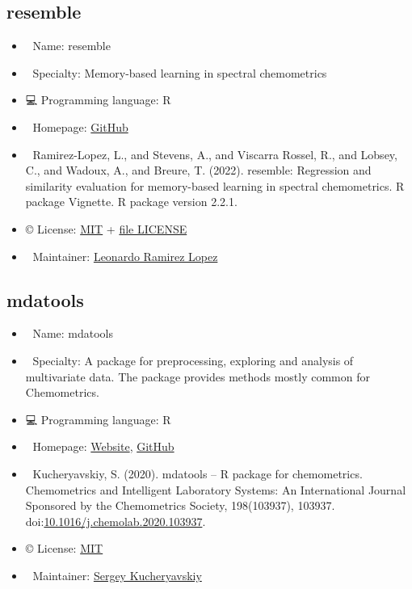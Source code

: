 \documentclass[
  letterpaper,
  DIV=11,
  numbers=noendperiod]{scrreprt}
\providecommand{\tightlist}{%
  \setlength{\itemsep}{0pt}\setlength{\parskip}{0pt}}\usepackage{longtable,booktabs,array}
\begin{document}
\subsection{resemble}\label{resemble}

\begin{itemize}
\tightlist
\item
  📛 Name: resemble\\
\item
  💼 Specialty: Memory-based learning in spectral chemometrics
\item
  💻 Programming language: R\\
\item
  🔗 Homepage:
  \href{https://github.com/l-ramirez-lopez/resemble}{GitHub}\\
\item
  📕 Ramirez-Lopez, L., and Stevens, A., and Viscarra Rossel, R., and
  Lobsey, C., and Wadoux, A., and Breure, T. (2022). resemble:
  Regression and similarity evaluation for memory-based learning in
  spectral chemometrics. R package Vignette. R package version 2.2.1.
\item
  ©️ License: \href{https://cran.r-project.org/web/licenses/MIT}{MIT} +
  \href{https://github.com/l-ramirez-lopez/resemble/blob/main/LICENSE}{file
  LICENSE}
\item
  📧 Maintainer: \href{https://github.com/l-ramirez-lopez}{Leonardo
  Ramirez Lopez}
\end{itemize}

\subsection{mdatools}\label{mdatools}

\begin{itemize}
\tightlist
\item
  📛 Name: mdatools\\
\item
  💼 Specialty: A package for preprocessing, exploring and analysis of
  multivariate data. The package provides methods mostly common for
  Chemometrics.
\item
  💻 Programming language: R\\
\item
  🔗 Homepage: \href{https://www.mdatools.com/}{Website},
  \href{https://github.com/svkucheryavski/mdatools}{GitHub}\\
\item
  📕 Kucheryavskiy, S. (2020). mdatools -- R package for chemometrics.
  Chemometrics and Intelligent Laboratory Systems: An International
  Journal Sponsored by the Chemometrics Society, 198(103937), 103937.
  doi:\href{https://doi.org/10.1016/j.chemolab.2020.103937}{10.1016/j.chemolab.2020.103937}.
\item
  ©️ License:
  \href{https://github.com/svkucheryavski/mdatools/blob/master/LICENSE.md}{MIT}
\item
  📧 Maintainer: \href{https://github.com/svkucheryavski}{Sergey
  Kucheryavskiy}
\end{itemize}
\end{document}
